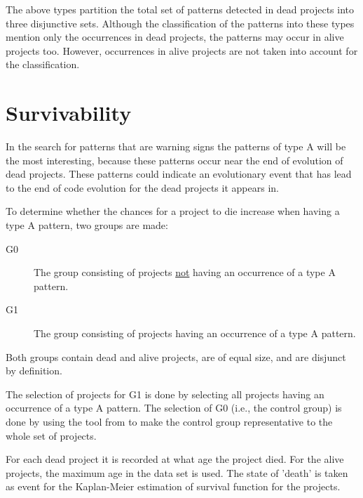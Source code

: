 \vspace{1em}
\noindent
The above types partition the total set of patterns detected in dead projects
into three disjunctive sets. Although the classification of the patterns into
these types mention only the occurrences in dead projects, the patterns may
occur in alive projects too. However, occurrences in alive projects are not
taken into account for the classification.

\section{Survivability}
\label{section:survivability}
In the search for patterns that are warning signs the patterns of type A will
be the most interesting, because these patterns occur near the end of evolution
of dead projects. These patterns could indicate an evolutionary event that has
lead to the end of code evolution for the dead projects it appears in.

To determine whether the chances for a project to die increase when having a
type A pattern, two groups are made:
\begin{description}
	\item[G0] \quad The group consisting of projects \underline{not} having an
		occurrence of a type A pattern.
	\item[G1] \quad The group consisting of projects having an occurrence of a type
		A pattern.
\end{description}

\noindent
Both groups contain dead and alive projects, are of equal size, and are
disjunct by definition.

The selection of projects for G1 is done by selecting all projects having an
occurrence of a type A pattern. The selection of G0 (i.e., the control group)
is done by using the tool from \citet{nagappan} to make the control group
representative to the whole set of projects.

For each dead project it is recorded at what age the project died. For the
alive projects, the maximum age in the data set is used. The state of 'death' is
taken as event for the Kaplan-Meier estimation of survival function for the
projects.

\begin{comment}
- Execution of the research
- Phases, steps

This chapter reports on the execution of the research method as described in Chapter 3.

If the research has been divided into phases (e.g., using sub questions) the
phases are introduced, reported on and concluded individually. If needed this
Chapter could be split up to balance out the sizes of all Chapters.
An example Research Chapter is provided as Chapter 3 at Paul’s home
page\footnote{http://homepages.cwi.nl/~paulk/thesesMasterSoftwareEngineering/2006/ReneWiegers.pdf}.
\end{comment}
